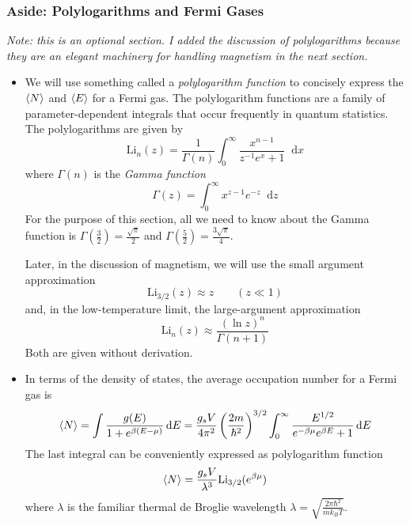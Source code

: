 \documentclass[11pt, a4paper]{article}
\newcommand{\diff}{\mathop{}\!\mathrm{d}} %
\begin{document}
\subsubsection{Aside: Polylogarithms and Fermi Gases} \label{sss:polylog}
\textit{Note: this is an optional section. I added the discussion of polylogarithms because they are an elegant machinery for handling magnetism in the next section.}
\begin{itemize}
	\item We will use something called a \textit{polylogarithm function} to concisely express the $ \expval{N} $ and $ \expval{E} $ for a Fermi gas. The polylogarithm functions are a family of parameter-dependent integrals that occur frequently in quantum statistics. The polylogarithms are given by
	\begin{equation*}
		\mathrm{Li}_{n}(z) = \frac{1}{\Gamma(n)} \int_{0}^{\infty} \frac{x^{n-1}}{z^{-1}e^{x}+1} \diff x
	\end{equation*}
	where $ \Gamma(n) $ is the \textit{Gamma function} 
	\begin{equation*}
		\Gamma(z) = \int_{0}^{\infty} x^{z-1}e^{-z}\diff z
	\end{equation*}
	For the purpose of this section, all we need to know about the Gamma function is $ \Gamma(\frac{3}{2}) = \frac{\sqrt{\pi}}{2} $ and $ \Gamma(\frac{5}{2}) = \frac{3\sqrt{\pi}}{4} $.

	Later, in the discussion of magnetism, we will use the small argument approximation
	\begin{equation*}
		\mathrm{Li}_{3/2}(z) \approx z \qquad (z \ll 1)
	\end{equation*}
	and, in the low-temperature limit, the large-argument approximation
	\begin{equation*}
		\mathrm{Li}_{n}(z) \approx \frac{(\ln z)^{n}}{\Gamma(n+1)} 
	\end{equation*}
	Both are given without derivation.
	
	\item In terms of the density of states, the average occupation number for a Fermi gas is
	\begin{equation*}
		\expval{N} = \int  \frac{g(E)}{1 + e^{\beta (E - \mu)}}  \diff E = \frac{g_{s}V}{4\pi^{2}} \left(\frac{2m}{\hbar^{2}}\right)^{3/2} \int_{0}^{\infty}\frac{E^{1/2}}{e^{-\beta \mu} e^{\beta E} + 1} \diff E 
	\end{equation*}
	The last integral can be conveniently expressed as polylogarithm function
	\begin{equation*}
		\expval{N} = \frac{g_{s}V}{\lambda^{3}}\mathrm{Li}_{3/2}(e^{\beta \mu})
	\end{equation*}
	where $ \lambda $ is the familiar thermal de Broglie wavelength $ \lambda = \sqrt{\frac{2\pi \hbar^{2}}{mk_{B}T}} $.
	

\end{itemize}
\end{document}
